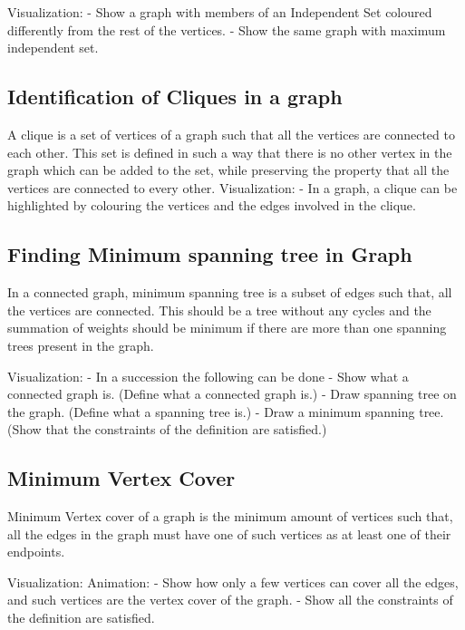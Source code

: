 Visualization: - Show a graph with members of an Independent Set
coloured differently from the rest of the vertices. - Show the same
graph with maximum independent set.

\hypertarget{identification-of-cliques-in-a-graph}{%
\subsection{Identification of Cliques in a
graph}\label{identification-of-cliques-in-a-graph}}

A clique is a set of vertices of a graph such that all the vertices are
connected to each other. This set is defined in such a way that there is
no other vertex in the graph which can be added to the set, while
preserving the property that all the vertices are connected to every
other. Visualization: - In a graph, a clique can be highlighted by
colouring the vertices and the edges involved in the clique.

\hypertarget{finding-minimum-spanning-tree-in-graph}{%
\subsection{Finding Minimum spanning tree in
Graph}\label{finding-minimum-spanning-tree-in-graph}}

In a connected graph, minimum spanning tree is a subset of edges such
that, all the vertices are connected. This should be a tree without any
cycles and the summation of weights should be minimum if there are more
than one spanning trees present in the graph.

Visualization: - In a succession the following can be done - Show what a
connected graph is. (Define what a connected graph is.) - Draw spanning
tree on the graph. (Define what a spanning tree is.) - Draw a minimum
spanning tree. (Show that the constraints of the definition are
satisfied.)

\hypertarget{minimum-vertex-cover}{%
\subsection{Minimum Vertex Cover}\label{minimum-vertex-cover}}

Minimum Vertex cover of a graph is the minimum amount of vertices such
that, all the edges in the graph must have one of such vertices as at
least one of their endpoints.

Visualization: Animation: - Show how only a few vertices can cover all
the edges, and such vertices are the vertex cover of the graph. - Show
all the constraints of the definition are satisfied.

